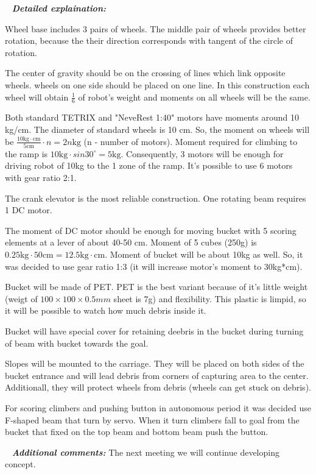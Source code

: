    \newline
  \textit{\textbf{Detailed explaination:}}
  \begin{enumerate*}
  	\item Wheel base includes 3 pairs of wheels. The middle pair of wheels provides better rotation, because the their direction corresponds with tangent of the circle of rotation.
  	
  	The center of gravity should be on the crossing of lines which link opposite wheels. wheels on one side should be placed on one line. In this construction each wheel will obtain $\frac{1}{6}$ of robot's weight and moments on all wheels will be the same. 
  	
  	
  	\item Both standard TETRIX and "NeveRest 1:40" motors have moments around 10 kg/cm. The diameter of standard wheels is 10 cm. So, the moment on wheels will be $\frac{10\text{kg} \cdot \text{cm}}{5\text{cm}} \cdot n = 2n\text{kg}$ (n - number of motors). Moment required for climbing to the ramp is $10\text{kg} \cdot sin30^\circ = 5\text{kg}$. Consequently, 3 motors will be enough for driving robot of 10kg to the 1 zone of the ramp. It's possible to use 6 motors with gear ratio 2:1.
  	\item The crank elevator is the most reliable construction. One rotating beam requires 1 DC motor.
  	
  	The moment of DC motor should be enough for moving bucket with 5 scoring elements at a lever of about 40-50 cm. Moment of 5 cubes (250g) is $0.25\text{kg} \cdot 50\text{cm} = 12.5\text{kg} \cdot \text{cm}$. Moment of bucket will be about 10kg as well. So, it was decided to use gear ratio 1:3 (it will increase motor's moment to 30kg*cm).
  	\item Bucket will be made of PET. PET is the best variant because of it's little weight (weigt of $100\times 100 \times 0.5mm$ sheet is 7g) and flexibility. This plastic is limpid, so it will be possible to watch how much debris inside it.
  	
  	Bucket will have special cover for retaining deebris in the bucket during turning of beam with bucket towards the goal.
  	
  	\item Slopes will be mounted to the carriage. They will be placed on both sides of the bucket entrance and will lead debris from corners of capturing area to the center. Additionall, they will protect wheels from debris (wheels can get stuck on debris).
  	
  	
  	\item For scoring climbers and pushing button in autonomous period it was decided use F-shaped beam that turn by servo. When it turn climbers fall to goal from the bucket that fixed on the top beam and bottom beam push the button.
  	
  \end{enumerate*}
  
   \newline
  \textit{\textbf{Additional comments:}} The next meeting we will continue developing concept.

\fillpage
